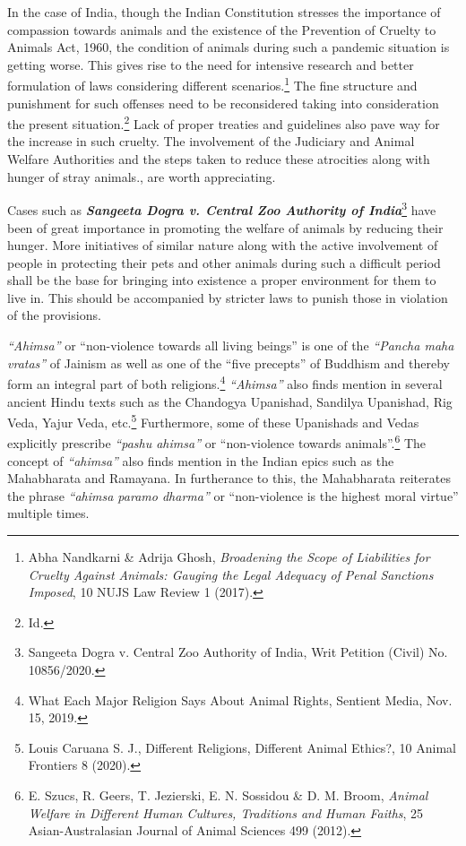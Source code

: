 \begin{multicols}{2}
\noi
In the case of India, though the Indian Constitution stresses the importance of compassion
towards animals and the existence of the Prevention of Cruelty to Animals Act, 1960, the
condition of animals during such a pandemic situation is getting worse. This gives rise to the need for intensive research and better formulation of laws considering different scenarios.\footnote{Abha Nandkarni \& Adrija Ghosh, \textit{Broadening the Scope of Liabilities for Cruelty Against Animals: Gauging
the Legal Adequacy of Penal Sanctions Imposed}, 10 NUJS Law Review 1 (2017).}
The fine structure and punishment for such offenses need to be reconsidered taking into
consideration the present situation.\footnote{Id.}
 Lack of proper treaties and guidelines also pave way for
the increase in such cruelty. The involvement of the Judiciary and Animal Welfare
Authorities and the steps taken to reduce these atrocities along with hunger of stray animals.,
are worth appreciating.

\noi
Cases such as {\it {\bfseries Sangeeta Dogra v. Central Zoo Authority of India}}\footnote{Sangeeta Dogra v. Central Zoo Authority of India, Writ Petition (Civil) No. 10856/2020.}
 have been of great
importance in promoting the welfare of animals by reducing their hunger. More initiatives of
similar nature along with the active involvement of people in protecting their pets and other
animals during such a difficult period shall be the base for bringing into existence a proper
environment for them to live in. This should be accompanied by stricter laws to punish those
in violation of the provisions. 


\noi
\textit{“Ahimsa”} or “non-violence towards all living beings” is one of the \textit{“Pancha maha vratas”} of
Jainism as well as one of the “five precepts” of Buddhism and thereby form an integral part
of both religions.\footnote{What Each Major Religion Says About Animal Rights, Sentient Media, Nov. 15, 2019.}
\textit{“Ahimsa”} also finds mention in several ancient Hindu texts such as the
Chandogya Upanishad, Sandilya Upanishad, Rig Veda, Yajur Veda, etc.\footnote{Louis Caruana S. J., Different Religions, Different Animal Ethics?, 10 Animal Frontiers 8 (2020). }
 Furthermore, some
of these Upanishads and Vedas explicitly prescribe \textit{“pashu ahimsa”} or “non-violence
towards animals”.\footnote{E. Szucs, R. Geers, T. Jezierski, E. N. Sossidou \& D. M. Broom, \textit{Animal Welfare in Different Human
Cultures, Traditions and Human Faiths}, 25 Asian-Australasian Journal of Animal Sciences 499 (2012).} The concept of \textit{“ahimsa”} also finds mention in the Indian epics such as
the Mahabharata and Ramayana. In furtherance to this, the Mahabharata reiterates the phrase
\textit{“ahimsa paramo dharma”} or “non-violence is the highest moral virtue” multiple times.


\end{multicols}
